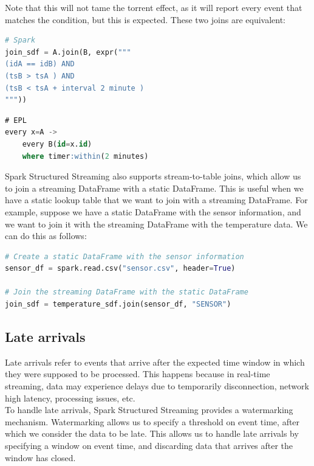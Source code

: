 Note that this will not tame the torrent effect, as it will report every event that matches the
condition, but this is expected. These two joins are equivalent:

\begin{lstlisting}[language=Python]
# Spark
join_sdf = A.join(B, expr("""
(idA == idB) AND
(tsB > tsA ) AND
(tsB < tsA + interval 2 minute )
"""))
\end{lstlisting}

\begin{lstlisting}[language=SQL]
# EPL
every x=A -> 
    every B(id=x.id)
    where timer:within(2 minutes)
\end{lstlisting}

Spark Structured Streaming also supports stream-to-table joins, which allow us to join a streaming
DataFrame with a static DataFrame. This is useful when we have a static lookup table that we want
to join with a streaming DataFrame. For example, suppose we have a static DataFrame with the sensor
information, and we want to join it with the streaming DataFrame with the temperature data. We can
do this as follows:

\begin{lstlisting}[language=Python]
# Create a static DataFrame with the sensor information
sensor_df = spark.read.csv("sensor.csv", header=True)

# Join the streaming DataFrame with the static DataFrame
join_sdf = temperature_sdf.join(sensor_df, "SENSOR")
\end{lstlisting}

\subsection{Late arrivals}

Late arrivals refer to events that arrive after the expected time window in which they were supposed
to be processed. This happens because in real-time streaming, data may experience delays due to 
temporarily disconnection, network high latency, processing issues, etc.\\

To handle late arrivals, Spark Structured Streaming provides a watermarking mechanism. Watermarking
allows us to specify a threshold on event time, after which we consider the data to be late. This
allows us to handle late arrivals by specifying a window on event time, and discarding data that
arrives after the window has closed.\\

